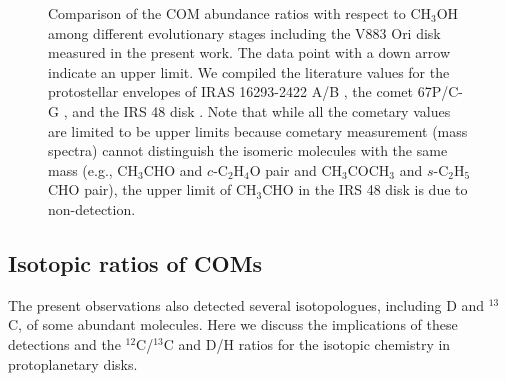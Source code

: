 \documentclass[linenumbers, twocolumn, twocolappendix, astrosymb, times]{aastex631}
\newcommand{\methanol}{CH$_3$OH\xspace}
\newcommand{\acetaldehyde}{CH$_3$CHO\xspace}
\newcommand{\methylformate}{CH$_3$OCHO\xspace}
\newcommand{\acetone}{CH$_3$COCH$_3$\xspace}
\newcommand{\ethyleneoxide}{$c$-C$_2$H$_4$O\xspace}
\newcommand{\propanal}{$s$-C$_2$H$_5$CHO\xspace}
\begin{document}
\begin{figure}
\caption{Comparison of the COM abundance ratios with respect to \methanol among different evolutionary stages including the V883 Ori disk measured in the present work. The data point with a down arrow indicate an upper limit. We compiled the literature values for the protostellar envelopes of IRAS 16293-2422 A/B \citep{Lykke2017, Jorgensen2018, Manigand2020, Manigand2021}, the comet 67P/C-G \citep{Rubin2019, Schuhmann2019}, and the IRS 48 disk \citep{Brunken2022}. Note that while all the cometary values are limited to be upper limits because cometary measurement (mass spectra) cannot distinguish the isomeric molecules with the same mass (e.g., \acetaldehyde and \ethyleneoxide pair and \acetone and \propanal pair), the upper limit of \acetaldehyde in the IRS 48 disk is due to non-detection.}
\label{fig:ratio_comparison}
\end{figure}



\subsection{Isotopic ratios of COMs}
The present observations also detected several isotopologues, including D and $^{13}$C, of some abundant molecules. Here we discuss the implications of these detections and the $^{12}$C/$^{13}$C and D/H ratios for the isotopic chemistry in protoplanetary disks. 
\end{document}

